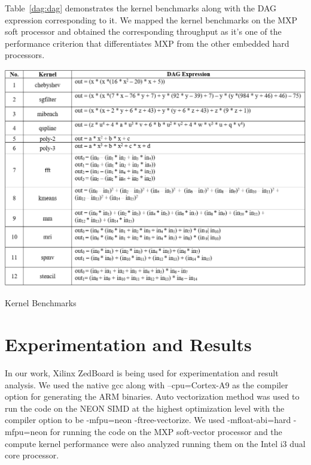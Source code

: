 Table~\ref{dag:dag} demonstrates the kernel benchmarks along with the DAG expression corresponding to it. We mapped the kernel benchmarks on the MXP soft processor and obtained the corresponding throughput as it's one of the performance criterion that differentiates MXP from the other embedded hard processors.

\begin{table}
	\centering
	\includegraphics[width=1\textwidth]{images/dag.png}
	\caption{Kernel Benchmarks}
	\label{dag:dag}
\end{table}

\section{Experimentation and Results}

In our work, Xilinx ZedBoard is being used for experimentation and result analysis. We used the native gcc along with --cpu=Cortex-A9 as the compiler option for generating the ARM binaries. Auto vectorization method was used to run the code on the NEON SIMD at the highest optimization level with the compiler option to be -mfpu=neon -ftree-vectorize. We used -mfloat-abi=hard -mfpu=neon for running the code on the MXP soft-vector processor and the compute kernel performance were also analyzed running them on the Intel i3 dual core processor.

